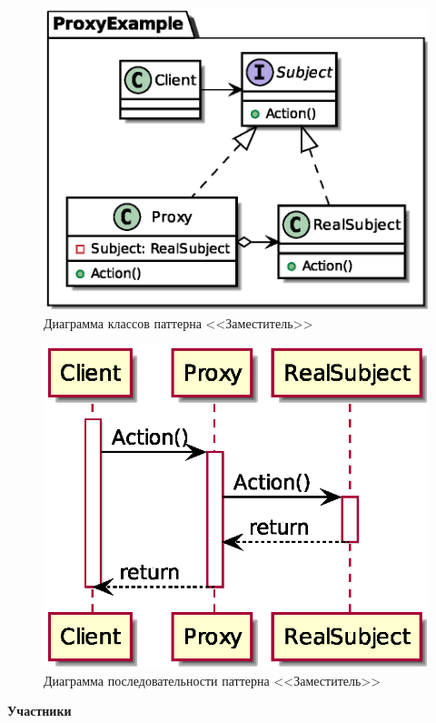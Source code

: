 \documentclass[PI,LAB]{HSEUniversity}
\begin{document}
\begin{figure}[p]
  \centering
  \includegraphics[scale=0.7]{Proxy_CD.eps}
  \caption{Диаграмма классов паттерна <<Заместитель>>}
\end{figure}

\begin{figure}[p]
  \centering
  \includegraphics[scale=0.75]{Proxy_SD.eps}
  \caption{Диаграмма последовательности паттерна <<Заместитель>>}
\end{figure}
\clearpage

\textbf{Участники}
\end{document}

